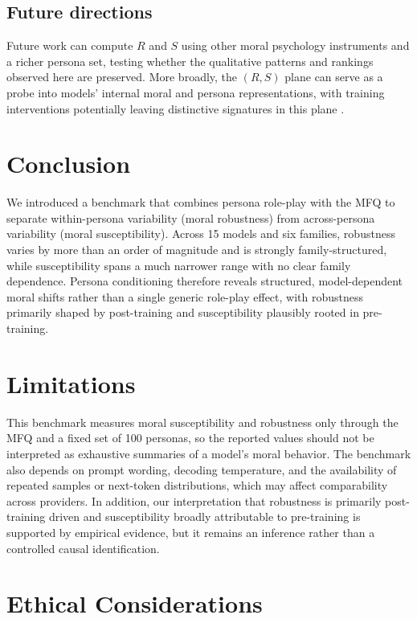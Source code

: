 \documentclass{article}
\begin{document}
\subsection{Future directions}

Future work can compute \(R\) and \(S\) using other moral psychology instruments and a richer persona set, testing whether the qualitative patterns and rankings observed here are preserved. More broadly, the \((R, S)\) plane can serve as a probe into models' internal moral and persona representations, with training interventions potentially leaving distinctive signatures in this plane \citep{costa2026personacollapse}.


\section{Conclusion}
We introduced a benchmark that combines persona role-play with the MFQ to separate within-persona variability (moral robustness) from across-persona variability (moral susceptibility). Across 15 models and six families, robustness varies by more than an order of magnitude and is strongly family-structured, while susceptibility spans a much narrower range with no clear family dependence. Persona conditioning therefore reveals structured, model-dependent moral shifts rather than a single generic role-play effect, with robustness primarily shaped by post-training and susceptibility plausibly rooted in pre-training.



\section*{Limitations}

This benchmark measures moral susceptibility and robustness only through the MFQ and a fixed set of 100 personas, so the reported values should not be interpreted as exhaustive summaries of a model's moral behavior. The benchmark also depends on prompt wording, decoding temperature, and the availability of repeated samples or next-token distributions, which may affect comparability across providers. In addition, our interpretation that robustness is primarily post-training driven and susceptibility broadly attributable to pre-training is supported by empirical evidence, but it remains an inference rather than a controlled causal identification.

\section*{Ethical Considerations}
\end{document}
